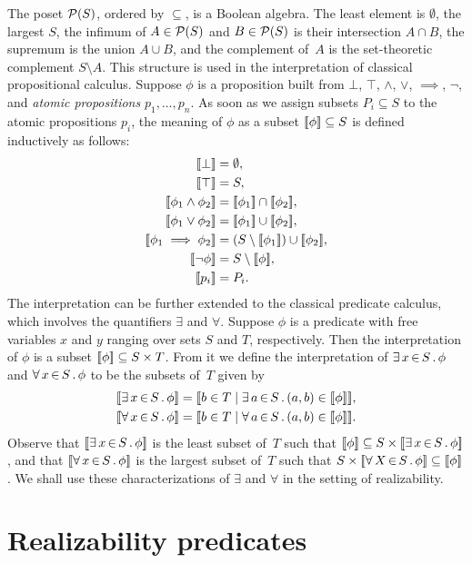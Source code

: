 The poset $\mathcal{P}(S)$, ordered by $\subseteq$, is a Boolean algebra. The
least element is $\emptyset$, the largest $S$, the infimum of $A \in
\mathcal{P}(S)$ and $B \in \mathcal{P}(S)$ is their intersection $A \cap B$, the
supremum is the union $A \cup B$, and the complement of~$A$ is the
set-theoretic complement $S \setminus A$. This structure is used in
the interpretation of classical propositional calculus. Suppose $\phi$
is a proposition built from $\bot$, $\top$, $\land$, $\lor$,
$\implies$, $\lnot$, and \emph{atomic propositions} $p_1, \ldots,
p_n$. As soon as we assign subsets $P_i \subseteq S$ to the atomic
propositions $p_i$, the meaning of $\phi$ as a subset $[\![\phi]\!]
\subseteq S$ is defined inductively as follows:
%
\begin{align*}
  \sem{\bot} &= \emptyset,\\
  \sem{\top} &= S,\\
  \sem{\phi_1 \land \phi_2} &= \sem{\phi_1} \cap \sem{\phi_2},\\
  \sem{\phi_1 \lor \phi_2} &= \sem{\phi_1} \cup \sem{\phi_2},\\
  \sem{\phi_1 \implies \phi_2} &= (S \setminus \sem{\phi_1}) \cup \sem{\phi_2},\\
  \sem{\lnot \phi} &= S \setminus \sem{\phi},\\
  \sem{p_i} &= P_i.
\end{align*}
%
The interpretation can be further extended to the classical predicate
calculus, which involves the quantifiers $\exists$ and $\forall$.
Suppose $\phi$ is a predicate with free variables $x$ and $y$ ranging
over sets $S$ and $T$, respectively. Then the interpretation of $\phi$
is a subset $[\![\phi]\!] \subseteq S \times T$. From it we define the
interpretation of $\exists\, x \,{\in}\, S\,.\,\phi$ and $\forall\, x \,{\in}\, S\,.\,\phi$ to be
the subsets of~$T$ given by
%
\begin{align*}
  \sem{\xsome{x}{S}{\phi}} &=
  \sem{b \in T \such \xsome{a}{S}{(a,b) \in \sem{\phi}}}, \\
  \sem{\xall{x}{S}{\phi}} &=
  \sem{b \in T \such \xall{a}{S}{(a,b) \in \sem{\phi}}}.
\end{align*}
%
Observe that $[\![\exists\, x \,{\in}\, S\,.\,\phi]\!]$ is the least subset of~$T$
such that $[\![\phi]\!] \subseteq S \times [\![\exists\, x \,{\in}\, S\,.\,\phi]\!]$,
and that $[\![\forall\, x \,{\in}\, S\,.\,\phi]\!]$ is the largest subset of~$T$ such
that $S \times [\![\forall\, X \,{\in}\, S\,.\,\phi]\!] \subseteq [\![\phi]\!]$. We shall
use these characterizations of $\exists$ and $\forall$ in the setting
of realizability.

\section{Realizability predicates}
\label{sec:realizability-predicates}


